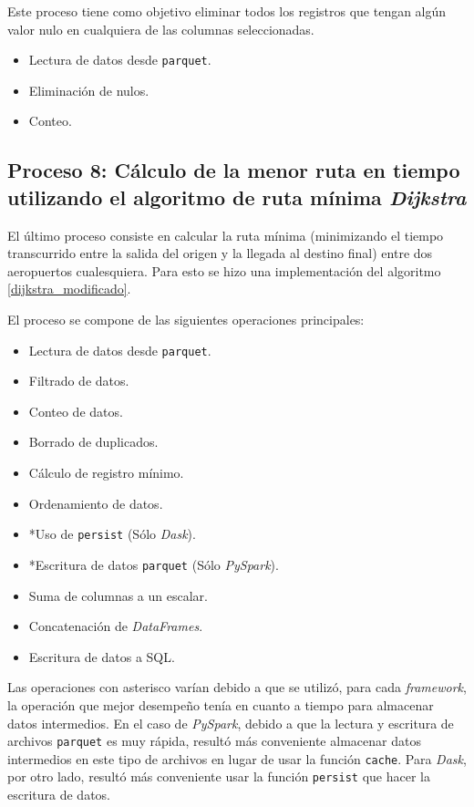 Este proceso tiene como objetivo eliminar todos los registros que tengan algún valor nulo en cualquiera de las columnas seleccionadas. 

\begin{itemize}
	\item Lectura de datos desde \texttt{parquet}.
	\item Eliminación de nulos.
	\item Conteo.
\end{itemize}

\subsection{Proceso 8: Cálculo de la menor ruta en tiempo utilizando el algoritmo de ruta mínima \textit{Dijkstra}}

El último proceso consiste en calcular la ruta mínima (minimizando el tiempo transcurrido entre la salida del origen y la llegada al destino final) entre dos aeropuertos cualesquiera. Para esto se hizo una implementación del algoritmo \ref{dijkstra_modificado}.   

El proceso se compone de las siguientes operaciones principales:

\begin{itemize}
	\item Lectura de datos desde \texttt{parquet}.
	\item Filtrado de datos.
	\item Conteo de datos.
	\item Borrado de duplicados.
	\item Cálculo de registro mínimo.
	\item Ordenamiento de datos.
	\item *Uso de \texttt{persist} (Sólo \textit{Dask}).
	\item *Escritura de datos \texttt{parquet} (Sólo \textit{PySpark}).
	\item Suma de columnas a un escalar.
	\item Concatenación de \textit{DataFrames}.
	\item Escritura de datos a SQL.
\end{itemize}

Las operaciones con asterisco varían debido a que se utilizó, para cada \textit{framework}, la operación que mejor desempeño tenía en cuanto a tiempo para almacenar datos intermedios. En el caso de \textit{PySpark}, debido a que la lectura y escritura de archivos \texttt{parquet} es muy rápida, resultó más conveniente almacenar datos intermedios en este tipo de archivos en lugar de usar la función \texttt{cache}. Para \textit{Dask}, por otro lado, resultó más conveniente usar la función \texttt{persist} que hacer la escritura de datos.

